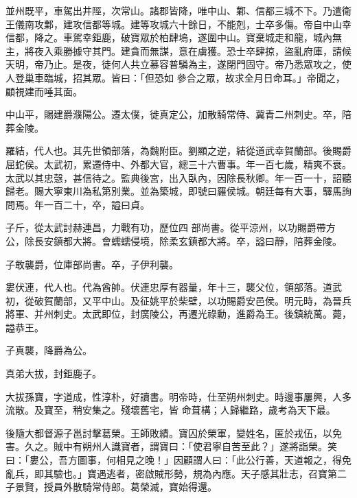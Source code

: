 \begin{pinyinscope}
 並州既平，車駕出井陘，次常山。諸郡皆降，唯中山、鄴、信都三城不下。乃遣衛王儀南攻鄴，建攻信都等城。建等攻城六十餘日，不能剋，士卒多傷。帝自中山幸信都，降之。車駕幸鉅鹿，破寶眾於柏肆塢，遂圍中山。寶棄城走和龍，城內無主，將夜入乘勝據守其門。建貪而無謀，意在虜獲。恐士卒肆掠，盜亂府庫，請候天明，帝乃止。是夜，徒何人共立慕容普驎為主，遂閉門固守。帝乃悉眾攻之，使人登巢車臨城，招其眾。皆曰：「但恐如
 參合之眾，故求全月日命耳。」帝聞之，顧視建而唾其面。



 中山平，賜建爵濮陽公。遷太僕，徙真定公，加散騎常侍、冀青二州刺史。卒，陪葬金陵。



 羅結，代人也。其先世領部落，為魏附臣。劉顯之逆，結從道武幸賀蘭部。後賜爵屈蛇侯。太武初，累遷侍中、外都大官，總三十六曹事。年一百七歲，精爽不衰。太武以其忠愨，甚信待之。監典後宮，出入臥內，因除長秋卿。年一百一十，詔聽歸老。賜大寧東川為私第別業。並為築城，即號曰羅侯城。朝廷每有大事，驛馬詢問焉。年一百二十，卒，謚曰貞。



 子斤，從太武討赫連昌，力戰有功，歷位四
 部尚書。從平涼州，以功賜爵帶方公，除長安鎮都大將。會蠕蠕侵境，除柔玄鎮都大將。卒，謚曰靜，陪葬金陵。



 子敢襲爵，位庫部尚書。卒，子伊利襲。



 婁伏連，代人也。代為酋帥。伏連忠厚有器量，年十三，襲父位，領部落。道武初，從破賀蘭部，又平中山。及征姚平於柴壁，以功賜爵安邑侯。明元時，為晉兵將軍、并州刺史。太武即位，封廣陵公，再遷光祿勳，進爵為王。後鎮統萬。薨，謚恭王。



 子真襲，降爵為公。



 真弟大拔，封鉅鹿子。



 大拔孫寶，字道成，性淳朴，好讀書。明帝時，仕至朔州刺史。時邊事屢興，人多流散。及寶至，稍安集之。殘壞舊宅，皆
 命葺構；人歸繼路，歲考為天下最。



 後隨大都督源子邕討擊葛榮。王師敗績。寶囚於榮軍，變姓名，匿於戎伍，以免害。久之。賊中有朔州人識寶者，謂寶曰：「使君寧自苦至此？」遂將詣榮。笑曰：「婁公，吾方圖事，何相見之晚！」因顧謂人曰：「此公行善，天道報之，得免亂兵，即其驗也。」寶遇逃者，密啟賊形勢，規為內應。天子感其壯志，召寶第二子景賢，授員外散騎常侍郎。葛榮滅，寶始得還。




\end{pinyinscope}
